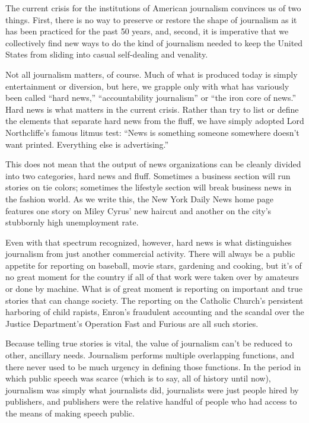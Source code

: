 The current crisis for the institutions of American journalism convinces us of
two things. First, there is no way to preserve or restore the shape of journalism
as it has been practiced for the past 50 years, and, second, it is imperative that
we collectively find new ways to do the kind of journalism needed to keep the
United States from sliding into casual self-dealing and venality.

Not all journalism matters, of course. Much of what is produced today is simply
entertainment or diversion, but here, we grapple only with what has variously
been called ``hard news,'' ``accountability journalism'' or ``the iron core of news.''
Hard news is what matters in the current crisis. Rather than try to list or define
the elements that separate hard news from the fluff, we have simply adopted
Lord Northcliffe’s famous litmus test: ``News is something someone somewhere
doesn’t want printed. Everything else is advertising.''

This does not mean that the output of news organizations can be cleanly divided
into two categories, hard news and fluff. Sometimes a business section will run
stories on tie colors; sometimes the lifestyle section will break business news in
the fashion world. As we write this, the New York Daily News home page features
one story on Miley Cyrus’ new haircut and another on the city’s stubbornly
high unemployment rate.

Even with that spectrum recognized, however, hard news is what distinguishes
journalism from just another commercial activity. There will always be a public
appetite for reporting on baseball, movie stars, gardening and cooking, but it’s of
no great moment for the country if all of that work were taken over by amateurs
or done by machine. What is of great moment is reporting on important and true
stories that can change society. The reporting on the Catholic Church’s persistent
harboring of child rapists, Enron’s fraudulent accounting and the scandal over the
Justice Department’s Operation Fast and Furious are all such stories.

Because telling true stories is vital, the value of journalism can’t be reduced to
other, ancillary needs. Journalism performs multiple overlapping functions, and
there never used to be much urgency in defining those functions. In the period
in which public speech was scarce (which is to say, all of history until now),
journalism was simply what journalists did, journalists were just people hired by
publishers, and publishers were the relative handful of people who had access to
the means of making speech public.

